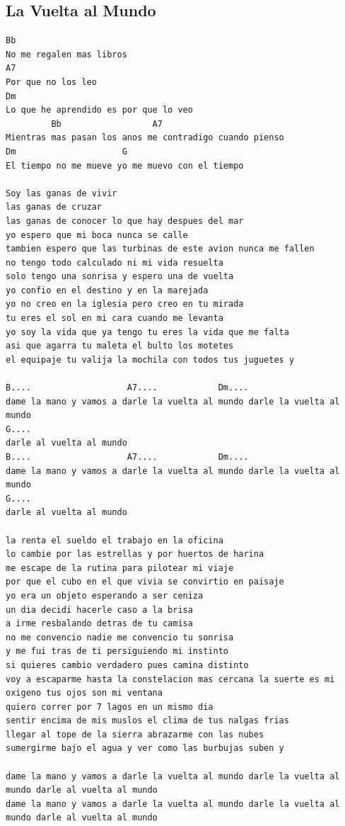\documentclass[a4paper]{article}
\begin{document}
\subsection{La Vuelta al Mundo} %
\label{sub:La Vuelta al Mu}

\begin{Verbatim}[commandchars=\\\{\}]
Bb
No me regalen mas libros
A7
Por que no los leo 
Dm
Lo que he aprendido es por que lo veo 
         Bb                  A7
Mientras mas pasan los anos me contradigo cuando pienso 
Dm                     G
El tiempo no me mueve yo me muevo con el tiempo 

Soy las ganas de vivir 
las ganas de cruzar 
las ganas de conocer lo que hay despues del mar 
yo espero que mi boca nunca se calle 
tambien espero que las turbinas de este avion nunca me fallen 
no tengo todo calculado ni mi vida resuelta 
solo tengo una sonrisa y espero una de vuelta
yo confio en el destino y en la marejada 
yo no creo en la iglesia pero creo en tu mirada 
tu eres el sol en mi cara cuando me levanta 
yo soy la vida que ya tengo tu eres la vida que me falta 
asi que agarra tu maleta el bulto los motetes 
el equipaje tu valija la mochila con todos tus juguetes y 

B....                   A7....            Dm....
dame la mano y vamos a darle la vuelta al mundo darle la vuelta al mundo 
G....
darle al vuelta al mundo 
B....                   A7....            Dm....
dame la mano y vamos a darle la vuelta al mundo darle la vuelta al mundo 
G....
darle al vuelta al mundo 

la renta el sueldo el trabajo en la oficina 
lo cambie por las estrellas y por huertos de harina 
me escape de la rutina para pilotear mi viaje 
por que el cubo en el que vivia se convirtio en paisaje 
yo era un objeto esperando a ser ceniza 
un dia decidi hacerle caso a la brisa 
a irme resbalando detras de tu camisa 
no me convencio nadie me convencio tu sonrisa 
y me fui tras de ti persiguiendo mi instinto 
si quieres cambio verdadero pues camina distinto 
voy a escaparme hasta la constelacion mas cercana la suerte es mi oxigeno tus ojos son mi ventana 
quiero correr por 7 lagos en un mismo dia 
sentir encima de mis muslos el clima de tus nalgas frias 
llegar al tope de la sierra abrazarme con las nubes 
sumergirme bajo el agua y ver como las burbujas suben y

dame la mano y vamos a darle la vuelta al mundo darle la vuelta al mundo darle al vuelta al mundo 
dame la mano y vamos a darle la vuelta al mundo darle la vuelta al mundo darle al vuelta al mundo
\end{Verbatim}
\newpage
\end{document}
